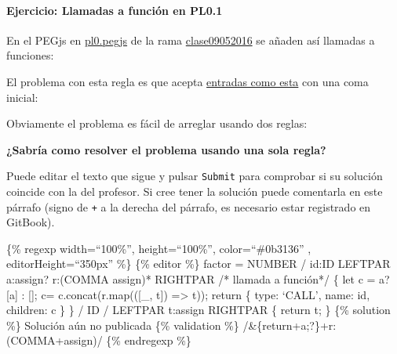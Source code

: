 \paragraph{Ejercicio: Llamadas a función en
PL0.1}\label{ejercicio-llamadas-a-funciuxf3n-en-pl0.1}

En el PEGjs en
\href{https://github.com/crguezl/pegjscalc/blob/clase09052016/lib/pl0.pegjs}{pl0.pegjs}
de la rama
\href{https://github.com/crguezl/pegjscalc/tree/clase09052016}{clase09052016}
se añaden así llamadas a funciones:

\begin{Shaded}
\begin{Highlighting}[]
\end{Highlighting}
\end{Shaded}

El problema con esta regla es que acepta
\href{https://github.com/crguezl/pegjscalc/blob/clase09052016/tests/simple1err.pl0}{entradas
como esta} con una coma inicial:

\begin{Shaded}
\begin{Highlighting}[]
   \NormalTok{) } 
\end{Highlighting}
\end{Shaded}

Obviamente el problema es fácil de arreglar usando dos reglas:

\begin{Shaded}
\begin{Highlighting}[]
\OtherTok{       /}  
\end{Highlighting}
\end{Shaded}

\textbf{¿Sabría como resolver el problema usando una sola regla?}

Puede editar el texto que sigue y pulsar \texttt{Submit} para comprobar
si su solución coincide con la del profesor. Si cree tener la solución
puede comentarla en este párrafo (signo de \texttt{+} a la derecha del
párrafo, es necesario estar registrado en GitBook).

\{\% regexp width=``100\%'', height=``100\%'', color=``\#0b3136'' ,
editorHeight=``350px'' \%\} \{\% editor \%\} factor = NUMBER / id:ID
LEFTPAR a:assign? r:(COMMA assign)* RIGHTPAR /* llamada a función*/ \{
let c = a? {[}a{]} : {[}{]}; c= c.concat(r.map(({[}\_, t{]})
=\textgreater{} t)); return \{ type: `CALL', name: id, children: c \} \}
/ ID / LEFTPAR t:assign RIGHTPAR \{ return t; \} \{\% solution \%\}
Solución aún no publicada \{\% validation \%\}
/\&\{\s*return\s+a;?\s*\}\s+r:(COMMA\s+assign)/ \{\% endregexp \%\}


